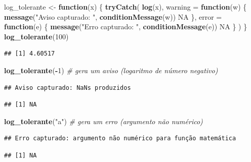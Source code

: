 \documentclass[
]{book}
\newenvironment{Shaded}{\begin{snugshade}}{\end{snugshade}}
\newcommand{\AttributeTok}[1]{\textcolor[rgb]{0.13,0.29,0.53}{#1}}
\newcommand{\CommentTok}[1]{\textcolor[rgb]{0.56,0.35,0.01}{\textit{#1}}}
\newcommand{\ConstantTok}[1]{\textcolor[rgb]{0.56,0.35,0.01}{#1}}
\newcommand{\ControlFlowTok}[1]{\textcolor[rgb]{0.13,0.29,0.53}{\textbf{#1}}}
\newcommand{\DecValTok}[1]{\textcolor[rgb]{0.00,0.00,0.81}{#1}}
\newcommand{\FunctionTok}[1]{\textcolor[rgb]{0.13,0.29,0.53}{\textbf{#1}}}
\newcommand{\NormalTok}[1]{#1}
\newcommand{\OtherTok}[1]{\textcolor[rgb]{0.56,0.35,0.01}{#1}}
\newcommand{\SpecialCharTok}[1]{\textcolor[rgb]{0.81,0.36,0.00}{\textbf{#1}}}
\newcommand{\StringTok}[1]{\textcolor[rgb]{0.31,0.60,0.02}{#1}}
\begin{document}
\begin{Shaded}
\begin{Highlighting}[]
\NormalTok{log\_tolerante }\OtherTok{\textless{}{-}} \ControlFlowTok{function}\NormalTok{(x) \{}
  \FunctionTok{tryCatch}\NormalTok{(}
    \FunctionTok{log}\NormalTok{(x),}
    \AttributeTok{warning =} \ControlFlowTok{function}\NormalTok{(w) \{}
      \FunctionTok{message}\NormalTok{(}\StringTok{"Aviso capturado: "}\NormalTok{, }\FunctionTok{conditionMessage}\NormalTok{(w))}
      \ConstantTok{NA}
\NormalTok{    \},}
    \AttributeTok{error =} \ControlFlowTok{function}\NormalTok{(e) \{}
      \FunctionTok{message}\NormalTok{(}\StringTok{"Erro capturado: "}\NormalTok{, }\FunctionTok{conditionMessage}\NormalTok{(e))}
      \ConstantTok{NA}
\NormalTok{    \}}
\NormalTok{  )}
\NormalTok{\}}
\FunctionTok{log\_tolerante}\NormalTok{(}\DecValTok{100}\NormalTok{)}
\end{Highlighting}
\end{Shaded}

\begin{verbatim}
## [1] 4.60517
\end{verbatim}

\begin{Shaded}
\begin{Highlighting}[]
\FunctionTok{log\_tolerante}\NormalTok{(}\SpecialCharTok{{-}}\DecValTok{1}\NormalTok{)      }\CommentTok{\# gera um aviso (logaritmo de número negativo)}
\end{Highlighting}
\end{Shaded}

\begin{verbatim}
## Aviso capturado: NaNs produzidos
\end{verbatim}

\begin{verbatim}
## [1] NA
\end{verbatim}

\begin{Shaded}
\begin{Highlighting}[]
\FunctionTok{log\_tolerante}\NormalTok{(}\StringTok{"a"}\NormalTok{)     }\CommentTok{\# gera um erro (argumento não numérico)}
\end{Highlighting}
\end{Shaded}

\begin{verbatim}
## Erro capturado: argumento não numérico para função matemática
\end{verbatim}

\begin{verbatim}
## [1] NA
\end{verbatim}
\end{document}
